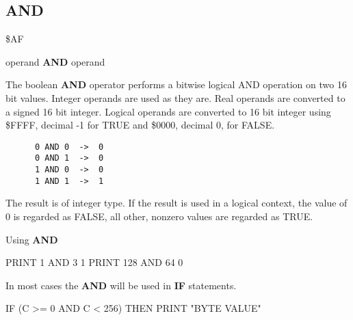 \subsection{AND}
\begin{description}[leftmargin=3cm,style=nextline]
\item [Token:] \$AF
\item [Format:] operand {\bf AND} operand
\item [Usage:]  The boolean {\bf AND} operator performs a bitwise
                logical AND operation on two 16 bit values.
                Integer operands are used as they are.
                Real operands are converted to a signed 16 bit integer.
                Logical operands are converted to 16 bit integer
                using \$FFFF, decimal -1 for TRUE
                and \$0000, decimal 0, for FALSE.

   \begin{verbatim}
      0 AND 0  ->  0
      0 AND 1  ->  0
      1 AND 0  ->  0
      1 AND 1  ->  1
   \end{verbatim}

\item [Remarks:] The result is of integer type.
                 If the result is used in a logical context,
                 the value of 0 is regarded as FALSE,
                 all other, nonzero values are regarded as TRUE.
\item [Example:] Using {\bf AND}

\begin{screenoutput}
  PRINT 1 AND 3
  1
  PRINT 128 AND 64
  0
\end{screenoutput}

In most cases the {\bf AND} will be used in {\bf IF} statements.

\begin{screenoutput}
   IF (C >= 0 AND C < 256) THEN PRINT "BYTE VALUE"
\end{screenoutput}
\end{description}


\newpage

